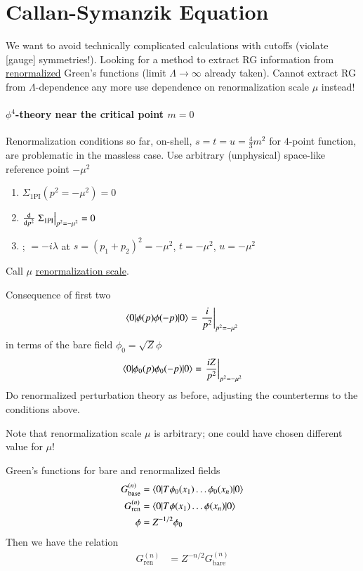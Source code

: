 
\section{Callan-Symanzik Equation}
We want to avoid technically complicated calculations with cutoffs (violate [gauge] symmetries!). Looking for a method to extract RG information from \underline{renormalized} Green's functions (limit $\Lambda \rightarrow \infty$ already taken). Cannot extract RG from $\Lambda$-dependence any more use dependence on renormalization scale $\mu$ instead!

\paragraph{$\phi^4$-theory near the critical point $m=0$}
Renormalization conditions so far, on-shell, $s=t=u=\frac{4}{3}m^2$ for $4$-point function, are problematic in the massless case. Use arbitrary (unphysical) space-like reference point $-\mu^2$
\begin{enumerate}
   \item $\Sigma_{1\text{PI}}(p^2 = -\mu^2) = 0$
   \item $\dv{p^2} \eval{\Sigma_{1\text{PI}}}_{p^2 = -\mu^2} = 0$
   \item {}; $=-i\lambda$ at $s = (p_1+p_2)^2 = -\mu^2$, $t = -\mu^2$, $u=-\mu^2$
\end{enumerate}
Call $\mu$ \underline{renormalization scale}.

Consequence of first two
\begin{align}
   \braket{0 | \phi(p) \phi(-p) | 0} = \eval{\frac{i}{p^2}}_{p^2 = -\mu^2} 
\end{align}
in terms of the bare field $\phi_0 = \sqrt{Z}\phi$
\begin{align}
   \braket{0 | \phi_0(p) \phi_0(-p) | 0} = \eval{\frac{iZ}{p^2}}_{p^2 = -\mu^2}
\end{align}
Do renormalized perturbation theory as before, adjusting the counterterms to the conditions above.

Note that renormalization scale $\mu$ is arbitrary; one could have chosen different value for $\mu$!

Green's functions for bare and renormalized fields
\begin{align*}
   G_{\text{base}}^{(n)} &= \braket{0 | T \phi_0 (x_1) \dots \phi_0(x_n) | 0 } \\
   G_{\text{ren}}^{(n)} &= \braket{0 | T \phi (x_1) \dots \phi(x_n) | 0 } \\
   \phi &= Z^{-1/2} \phi_0
\end{align*}
Then we have the relation
\begin{align}
   G_\text{ren}^{(n)} &= Z^{-n/2} G_\text{bare}^{(n)}
\end{align}

